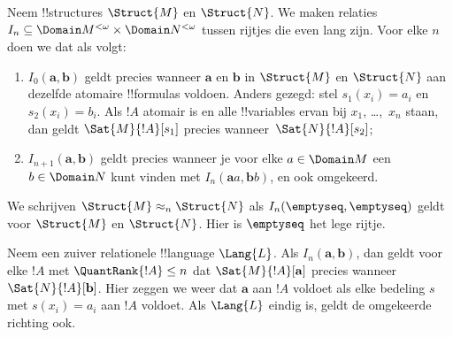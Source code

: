 \documentclass[../../../include/open-logic-section]{subfiles}
\begin{document}
\begin{defn}
  Neem !!{structure}s $\Struct{M}$ en $\Struct{N}$. We maken relaties
  $I_n \subseteq \Domain M^{<\omega} \times \Domain N^{<\omega}$
  tussen rijtjes die even lang zijn. Voor elke $n$ doen we dat als volgt:
   \begin{enumerate}
   \item $I_0(\mathbf{a},\mathbf{b})$ geldt precies wanneer
     $\mathbf{a}$ en $\mathbf{b}$ in $\Struct{M}$ en $\Struct{N}$
     aan dezelfde atomaire !!{formula}s voldoen. Anders gezegd: stel
     $s_1(x_i) = a_i$ en $s_2(x_i) = b_i$. Als $!A$ atomair is en alle
     !!{variable}s ervan bij $x_1$, \dots,~$x_n$ staan, dan geldt
     $\Sat{M}{!A}[s_1]$ precies wanneer~$\Sat{N}{!A}[s_2]$;
   \item $I_{n+1} (\mathbf{a},\mathbf{b})$ geldt precies wanneer je
     voor elke $a\in \Domain M$ een $b\in \Domain N$ kunt vinden met
     $I_n(\mathbf{a}a,\mathbf{b}b)$, en ook omgekeerd.
   \end{enumerate}
\end{defn}


\begin{defn}
  We schrijven $\Struct{M} \approx_n \Struct{N}$ als
  $I_n(\emptyseq,\emptyseq)$ geldt voor $\Struct{M}$ en
  $\Struct{N}$. Hier is $\emptyseq$ het lege rijtje.
\end{defn}

\begin{thm}
  Neem een zuiver relationele !!{language} $\Lang{L}$. Als
  $I_n(\mathbf{a},\mathbf{b})$, dan geldt voor elke $!A$ met
  $\QuantRank{!A} \le n$ dat $\Sat{M}{!A}[\mathbf{a}]$ precies wanneer
  $\Sat{N}{!A}[\mathbf{b}]$. Hier zeggen we weer dat $\mathbf{a}$ aan
  $!A$ voldoet als elke bedeling $s$ met $s(x_i) = a_i$ aan $!A$
  voldoet. Als $\Lang{L}$ eindig is, geldt de omgekeerde richting ook.
\end{thm}
\end{document}
